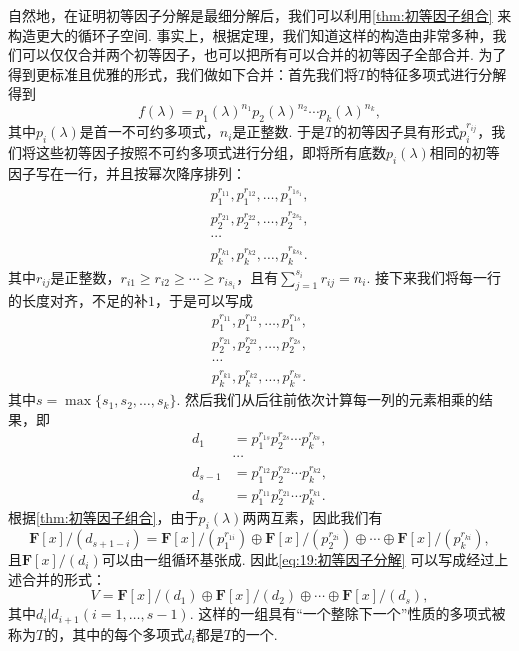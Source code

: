 自然地，在证明初等因子分解是最细分解后，我们可以利用\autoref{thm:初等因子组合} 来构造更大的循环子空间. 事实上，根据定理，我们知道这样的构造由非常多种，我们可以仅仅合并两个初等因子，也可以把所有可以合并的初等因子全部合并. 为了得到更标准且优雅的形式，我们做如下合并：首先我们将$T$的特征多项式进行分解得到
\[f(\lambda)=p_1(\lambda)^{n_1}p_2(\lambda)^{n_2}\cdots p_k(\lambda)^{n_k},\]
其中$p_i(\lambda)$是首一不可约多项式，$n_i$是正整数. 于是$T$的初等因子具有形式$p_i^{r_{ij}}$，我们将这些初等因子按照不可约多项式进行分组，即将所有底数$p_i(\lambda)$相同的初等因子写在一行，并且按幂次降序排列：
\begin{gather*}
    p_1^{r_{11}},p_1^{r_{12}},\ldots,p_1^{r_{1s_1}}, \\
    p_2^{r_{21}},p_2^{r_{22}},\ldots,p_2^{r_{2s_2}}, \\
    \cdots \\
    p_k^{r_{k1}},p_k^{r_{k2}},\ldots,p_k^{r_{ks_k}}.
\end{gather*}
其中$r_{ij}$是正整数，$r_{i1}\geqslant r_{i2}\geqslant\cdots\geqslant r_{is_i}$，且有$\sum\limits_{j=1}^{s_i}r_{ij}=n_i$. 接下来我们将每一行的长度对齐，不足的补$1$，于是可以写成
\begin{gather*}
    p_1^{r_{11}},p_1^{r_{12}},\ldots,p_1^{r_{1s}}, \\
    p_2^{r_{21}},p_2^{r_{22}},\ldots,p_2^{r_{2s}}, \\
    \cdots \\
    p_k^{r_{k1}},p_k^{r_{k2}},\ldots,p_k^{r_{ks}}.
\end{gather*}
其中$s=\max\{s_1,s_2,\ldots,s_k\}$. 然后我们从后往前依次计算每一列的元素相乘的结果，即
\begin{align*}
    d_1     & =p_1^{r_{1s}}p_2^{r_{2s}}\cdots p_k^{r_{ks}}, \\
            & \cdots                                        \\
    d_{s-1} & =p_1^{r_{12}}p_2^{r_{22}}\cdots p_k^{r_{k2}}, \\
    d_s     & =p_1^{r_{11}}p_2^{r_{21}}\cdots p_k^{r_{k1}}.
\end{align*}
根据\autoref{thm:初等因子组合}，由于$p_i(\lambda)$两两互素，因此我们有
\[\mathbf{F}[x]/(d_{s+1-i})=\mathbf{F}[x]/(p_1^{r_{1i}})\oplus\mathbf{F}[x]/(p_2^{r_{2i}})\oplus\cdots\oplus\mathbf{F}[x]/(p_k^{r_{ki}}),\]
且$\mathbf{F}[x]/(d_i)$可以由一组循环基张成. 因此\autoref{eq:19:初等因子分解} 可以写成经过上述合并的形式：
\begin{equation} \label{eq:20:不变因子分解}
    V=\mathbf{F}[x]/(d_1)\oplus\mathbf{F}[x]/(d_2)\oplus\cdots\oplus\mathbf{F}[x]/(d_s),
\end{equation}
其中$d_i|d_{i+1}(i=1,\ldots,s-1)$. 这样的一组具有``一个整除下一个''性质的多项式被称为$T$的，其中的每个多项式$d_i$都是$T$的一个.

